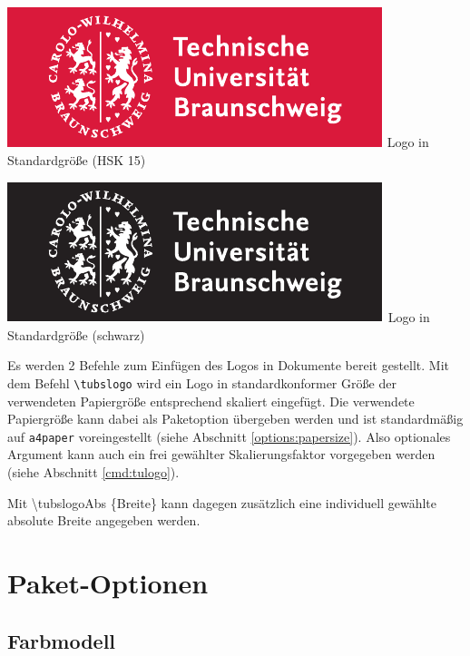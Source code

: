 \documentclass{scrartcl}
\begin{document}
\begin{minipage}{0.5\textwidth}
  \centering
  \includegraphics[width=\tulogoBaseWidth]{TUBraunschweig_SC}
  {\sffamily Logo in Standardgröße (HSK 15)}
\end{minipage}
\begin{minipage}{0.5\textwidth}
  \centering
  \includegraphics[width=\tulogoBaseWidth]{TUBraunschweig_B}
  {\sffamily Logo in Standardgröße (schwarz)}
\end{minipage}

Es werden 2 Befehle zum Einfügen des Logos in Dokumente bereit gestellt.
Mit dem Befehl {\color{tuRed}\lstinline{\tubslogo}} wird ein Logo in
standardkonformer Größe der verwendeten Papiergröße entsprechend skaliert
eingefügt. Die verwendete Papiergröße kann dabei als Paketoption übergeben
werden und ist standardmäßig auf \lstinline{a4paper} voreingestellt
(siehe Abschnitt \ref{options:papersize}).
Also optionales Argument kann auch ein frei gewählter Skalierungsfaktor
vorgegeben werden (siehe Abschnitt \ref{cmd:tulogo}).

Mit {\color{tuRed}\ttfamily \textbackslash tubslogoAbs%
    \{\textcolor{tuGreenDark}{Breite}\}}
kann dagegen zusätzlich eine individuell gewählte absolute Breite
angegeben werden.


\section{Paket-Optionen}

\subsection{Farbmodell}\label{options:color}
\end{document}
